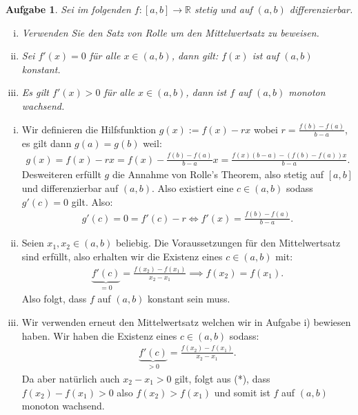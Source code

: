 \documentclass[a4paper, 20]{exam}
\newtheorem{ex}{Aufgabe}
\begin{document}
\begin{ex} Sei im folgenden $f:[a,b] \longrightarrow \mathbb{R}$ stetig und auf $(a,b)$ differenzierbar. 
\begin{enumerate}[i)]
\item Verwenden Sie den Satz von Rolle um den Mittelwertsatz zu beweisen.
\item Sei $f'(x)=0$ für alle $x \in (a,b)$, dann gilt: $f(x)$ ist auf $(a,b)$ konstant.
\item Es gilt $f'(x) >0$ für alle $x \in (a,b)$, dann ist $f$ auf $(a,b)$ monoton wachsend. 
\end{enumerate}

\end{ex}


\begin{solution}
\begin{enumerate}[i)]
\item Wir definieren die Hilfsfunktion $g(x):= f(x)-rx$ wobei $r= \frac{f(b)-f(a)}{b-a}$, es gilt dann $g(a)=g(b)$ weil:
\begin{align*}
g(x)=f(x)-rx= f(x)- \frac{f(b)-f(a)}{b-a}x  =  \frac{f(x)(b-a)- (f(b)-f(a))x}{b-a}. 
\end{align*}
Desweiteren erfüllt $g$ die Annahme von Rolle's Theorem, also stetig auf $[a,b]$ und differenzierbar auf $(a,b)$. Also existiert eine $c \in (a,b)$ sodass $g'(c)=0$ gilt. Also:
\begin{align*}
g'(c)=0 = f'(c)-r \iff f'(x) = \frac{f(b)-f(a)}{b-a}.
\end{align*}
\item Seien $x_1,x_2 \in (a,b)$ beliebig. Die Voraussetzungen für den Mittelwertsatz sind erfüllt,  also erhalten wir die Existenz eines $c \in (a,b)$ mit: 
\begin{align*}
\underbrace{f'(c)}_{=0} = \frac{f(x_2)-f(x_1)}{x_2-x_1} \implies f(x_2)=f(x_1).
\end{align*}
Also folgt, dass $f$ auf $(a,b)$ konstant sein muss. 
\item Wir verwenden erneut den Mittelwertsatz welchen wir in Aufgabe i) bewiesen haben. Wir haben die Existenz eines $c \in (a,b)$ sodass: 
\begin{align*}
\underbrace{f'(c)}_{>0}= \frac{f(x_2)-f(x_1)}{x_2-x_1} \tag{*}.
\end{align*}
Da aber natürlich auch $x_2-x_1>0$ gilt, folgt aus (*), dass $f(x_2)-f(x_1)>0$ also $f(x_2)>f(x_1)$ und somit ist $f$ auf $(a,b)$ monoton wachsend. 
\end{enumerate}
\end{solution}
\end{document}
